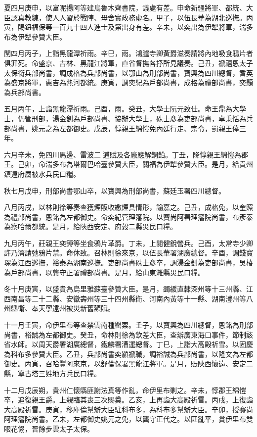\begin{pinyinscope}
夏四月庚申，以富呢揚阿等建鳥魯木齊書院，議處有差。申命新疆將軍、都統、大臣認真教練，使人人習於戰陣、毋舍實政務虛名。甲子，以伍長華為湖北巡撫。丙寅，賜鈕福保等一百九十四人進士及第出身有差。辛未，以奕出為伊犁將軍，湍多布為伊犁參贊大臣。

閏四月丙子，上詣黑龍潭祈雨。辛巳，雨。鴻臚寺卿黃爵滋奏請將內地吸食鴉片者俱罪死。命盛京、吉林、黑龍江將軍，直省督撫各抒所見議奏。己丑，褫禧恩太子太保銜兵部尚書，調成格為兵部尚書，以鄂山為刑部尚書，寶興為四川總督，耆英為盛京將軍，惠吉為熱河都統。庚寅，調奕紀為戶部尚書，成格為禮部尚書，奕顥為兵部尚書。

五月丙午，上詣黑龍潭祈雨。己酉，雨。癸丑，大學士阮元致仕。命王鼎為大學士，仍管刑部，湯金釗為戶部尚書、協辦大學士，硃士彥為吏部尚書，卓秉恬為兵部尚書，姚元之為左都御史。戊辰，惇親王綿愷免內廷行走、宗令，罰親王俸三年。

六月辛未，免四川馬邊、雷波二逋賦及各廠應解銅鉛。丁丑，降惇親王綿愷為郡王。己卯，命湍多布為塔爾巴哈臺參贊大臣，關福為伊犁參贊大臣。是月，給貴州鎮遠府屬被水兵民口糧。

秋七月戊申，刑部尚書鄂山卒，以寶興為刑部尚書，蘇廷玉署四川總督。

八月丙戌，以林則徐等奏查獲煙販收繳煙具情形，諭嘉之。己丑，成格免，以奎照為禮部尚書，恩銘為左都御史。命奕紀管理籓院。以賽尚阿署理籓院尚書，布彥泰為察哈爾都統。是月，給陜西安定、府穀二縣災民口糧。

九月丙午，莊親王奕鎛等坐食鴉片革爵。丁未，上閱健銳營兵。己酉，太常寺少卿許乃濟請弛鴉片禁。命休致。召林則徐來京，以伍長華署湖廣總督。辛酉，調錢寶琛為江西巡撫，裕泰為湖南巡撫。吏部尚書硃士彥卒，調湯金釗為吏部尚書，吳椿為戶部尚書，以龔守正署禮部尚書。是月，給山東濰縣災民口糧。

冬十月庚寅，以盛貴為烏里雅蘇臺參贊大臣。是月，蠲緩直隸深州等十三州縣、江西南昌等二十二縣、安徽壽州等三十四州縣衛、河南內黃等十一縣、湖南澧州等八州縣衛、奉天寧遠州被災新舊額賦。

十一月壬寅，命伊里布等查禁雲南種罌粟。壬子，以寶興為四川總督，恩銘為刑部尚書，裕誠為左都御史。癸丑，命林則徐為欽差大臣，查辦廣東海口事件，節制該省水師。以周天爵署湖廣總督，鐵麟署漕運總督。丁巳，上詣大高殿祈雪。以固慶為科布多參贊大臣。乙丑，兵部尚書奕顥褫職，調裕誠為兵部尚書，以隆文為左都御史。丙寅，召哈豐阿來京，以舒倫保署黑龍江將軍。是月，賑陜西懷遠、安定二縣，寧古塔三姓地方兵民口糧。

十二月戊辰朔，貴州仁懷縣匪謝法真等作亂，命伊里布剿之。辛未，惇郡王綿愷卒，追復親王爵。上親臨其喪三次賜奠。乙亥，上再詣大高殿祈雪。丙戌，上復詣大高殿祈雪。庚寅，移庫倫幫辦大臣駐科布多，為科布多幫辦大臣。辛卯，授賽尚阿理籓院尚書。乙未，左都御史姚元之免，以龔守正代之。以匪亂平，賞伊里布雙眼花翎，晉餘步雲太子太保。


\end{pinyinscope}
